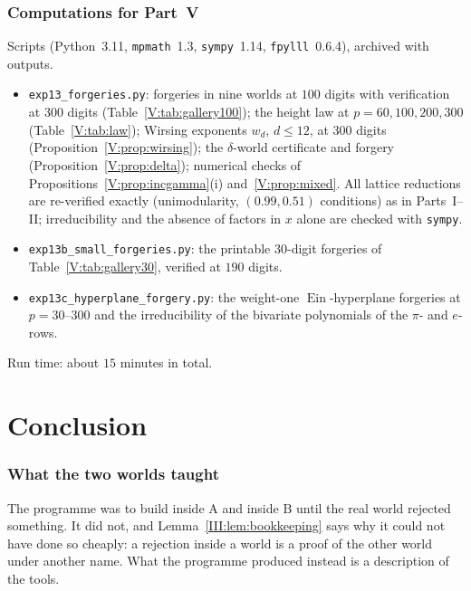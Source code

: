 \documentclass[11pt,a4paper]{article}
\newcommand{\Ein}{\operatorname{Ein}}
\theoremstyle{definition}
\theoremstyle{remark}
\numberwithin{equation}{section}
\begin{document}
\section{Computations for Part~V}\label{V:sec:computations}

Scripts (Python~3.11, \texttt{mpmath}~1.3, \texttt{sympy}~1.14, \texttt{fpylll}~0.6.4),
archived with outputs.
\begin{itemize}[leftmargin=*]
\item \texttt{exp13\_forgeries.py}: forgeries in nine worlds at $100$ digits with verification
at $300$ digits (Table~\ref{V:tab:gallery100}); the height law at $p=60,100,200,300$
(Table~\ref{V:tab:law}); Wirsing exponents $w_d$, $d\le12$, at $300$ digits
(Proposition~\ref{V:prop:wirsing}); the $\delta$-world certificate and forgery
(Proposition~\ref{V:prop:delta}); numerical checks of Propositions~\ref{V:prop:incgamma}(i)
and~\ref{V:prop:mixed}. All lattice reductions are re-verified exactly (unimodularity,
$(0.99,0.51)$ conditions) as in Parts~I--II; irreducibility and the absence of factors in
$x$ alone are checked with \texttt{sympy}.
\item \texttt{exp13b\_small\_forgeries.py}: the printable $30$-digit forgeries of
Table~\ref{V:tab:gallery30}, verified at $190$ digits.
\item \texttt{exp13c\_hyperplane\_forgery.py}: the weight-one $\Ein$-hyperplane forgeries at
$p=30$--$300$ and the irreducibility of the bivariate polynomials of the $\pi$- and
$e$-rows.
\end{itemize}
Run time: about $15$ minutes in total.


\part*{Conclusion}

\section{What the two worlds taught}\label{sec:conclusion}

The programme was to build inside $\mathrm A$ and inside $\mathrm B$ until the real
world rejected something. It did not, and Lemma~\ref{III:lem:bookkeeping} says why it
could not have done so cheaply: a rejection inside a world is a proof of the other world
under another name. What the programme produced instead is a description of the tools.
\end{document}
